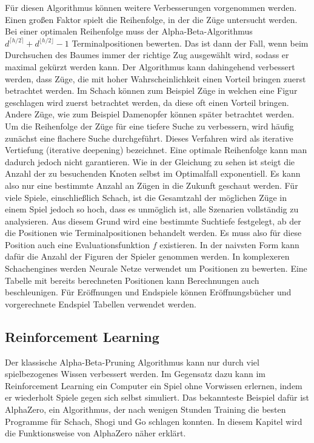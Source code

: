 Für diesen Algorithmus können weitere Verbesserungen vorgenommen werden. Einen großen Faktor spielt die Reihenfolge, in der die Züge untersucht werden. Bei einer optimalen Reihenfolge muss der Alpha-Beta-Algorithmus $d^{\lceil h/2 \rceil} + d^{\lfloor h/2 \rfloor} - 1$ Terminalpositionen bewerten. \cite{knuth_analysis_1975} Das ist dann der Fall, wenn beim Durchsuchen des Baumes immer der richtige Zug ausgewählt wird, sodass er maximal gekürzt werden kann. Der Algorithmus kann dahingehend verbessert werden, dass Züge, die mit hoher Wahrscheinlichkeit einen Vorteil bringen zuerst betrachtet werden. Im Schach können zum Beispiel Züge in welchen eine Figur geschlagen wird zuerst betrachtet werden, da diese oft einen Vorteil bringen. Andere Züge, wie zum Beispiel Damenopfer können später betrachtet werden.
Um die Reihenfolge der Züge für eine tiefere Suche zu verbessern, wird häufig zunächst eine flachere Suche durchgeführt. Dieses Verfahren wird als iterative Vertiefung (iterative deepening) bezeichnet. 
Eine optimale Reihenfolge kann man dadurch jedoch nicht garantieren. Wie in der Gleichung zu sehen ist steigt die Anzahl der zu besuchenden Knoten selbst im Optimalfall exponentiell. Es kann also nur eine bestimmte Anzahl an Zügen in die Zukunft geschaut werden. Für viele Spiele, einschließlich Schach, ist die Gesamtzahl der möglichen Züge in einem Spiel jedoch so hoch, dass es unmöglich ist, alle Szenarien vollständig zu analysieren. Aus diesem Grund wird eine bestimmte Suchtiefe festgelegt, ab der die Positionen wie Terminalpositionen behandelt werden.\cite{knuth_analysis_1975} Es muss also für diese Position auch eine Evaluationsfunktion $f$ existieren. In der naivsten Form kann dafür die Anzahl der Figuren der Spieler genommen werden. In komplexeren Schachengines werden Neurale Netze verwendet um Positionen zu bewerten. Eine Tabelle mit bereits berechneten Positionen kann Berechnungen auch beschleunigen. Für Eröffnungen und Endspiele können Eröffnungsbücher und vorgerechnete Endspiel Tabellen verwendet werden.\cite{silver_mastering_2017}

\subsection{Reinforcement Learning}
Der klassische Alpha-Beta-Pruning Algorithmus kann nur durch viel spielbezogenes Wissen verbessert werden. Im Gegensatz dazu kann im Reinforcement Learning ein Computer ein Spiel ohne Vorwissen erlernen, indem er wiederholt Spiele gegen sich selbst simuliert. Das bekannteste Beispiel dafür ist AlphaZero, ein Algorithmus, der nach wenigen Stunden Training die besten Programme für Schach, Shogi und Go schlagen konnten. \cite{silver_mastering_2017} In diesem Kapitel wird die Funktionsweise von AlphaZero näher erklärt.

